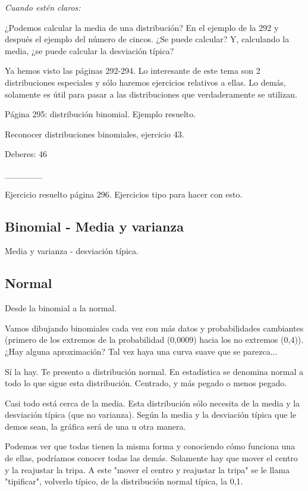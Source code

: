 \textit{Cuando estén claros:} 

¿Podemos calcular la media de una distribución? En el ejemplo de la 292 y después el ejemplo del número de cincos. ¿Se puede calcular? Y, calculando la media, ¿se puede calcular la desviación típica?

Ya hemos visto las páginas 292-294. Lo interesante de este tema son 2 distribuciones especiales y sólo haremos ejercicios relativos a ellas. Lo demás, solamente es útil para pasar a las distribuciones que verdaderamente se utilizan.

Página 295: distribución binomial. Ejemplo resuelto.

Reconocer distribuciones binomiales, ejercicio 43.

Deberes: 46


______

Ejercicio resuelto página 296. Ejercicios tipo para hacer con esto.

\subsection{Binomial - Media y varianza}

Media y varianza - desviación típica.

\subsection{Normal}

Desde la binomial a la normal.


Vamos dibujando binomiales cada vez con más datos y probabilidades cambiantes (primero de los extremos de la probabilidad (0,0009) hacia los no extremos (0,4)). ¿Hay alguna aproximación? Tal vez haya una curva suave que se parezca...

Sí la hay.  Te presento a distribución normal. En estadística se denomina normal a todo lo que sigue esta distribución. Centrado, y más pegado o menos pegado.

Casi todo está cerca de la media. Esta distribución sólo necesita de la media y la desviación típica (que no varianza). Según la media y la desviación típica que le demos sean, la gráfica será de una u otra manera.

Podemos ver que todas tienen la misma forma y conociendo cómo funciona una de ellas, podríamos conocer todas las demás. Solamente hay que mover el centro y la reajustar la tripa. A este "mover el centro y reajustar la tripa" se le llama "tipificar", volverlo típico, de la distribución normal típica, la 0,1. 

